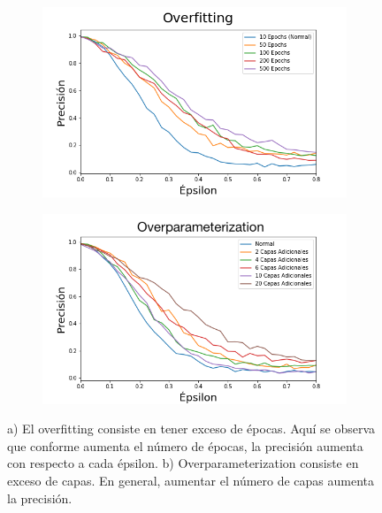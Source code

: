 \begin{figure}[h]
    \centering
    \begin{subfigure}[b]{0.49\textwidth}
        \centering
        \includegraphics[width=\textwidth]{images/overfit_vs_attack.png}
        \caption{}
        \label{overfit}
    \end{subfigure}
    \begin{subfigure}[b]{0.49\textwidth}
        \centering
        \includegraphics[width=\textwidth]{images/overparam_vs_attack.png}
        \caption{}
        \label{overparam}
    \end{subfigure}
    \caption{ a) El overfitting consiste en tener exceso de épocas. Aquí se observa que conforme aumenta el número de épocas, la precisión aumenta con respecto a cada épsilon. b) Overparameterization consiste en exceso de capas. En general, aumentar el número de capas aumenta la precisión.}
    \label{overaparam_overfit}
\end{figure}

